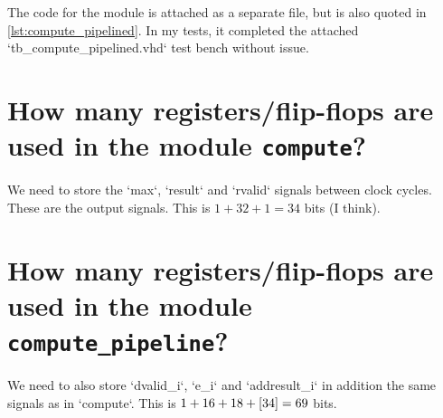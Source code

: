 \documentclass[british,fleqn]{article}
\begin{document}
The code for the module is attached as a separate file, but is also quoted in
\autoref{lst:compute_pipelined}. In my tests, it completed the attached
`tb_compute_pipelined.vhd` test bench without issue.



\section[Task 7]{%
  How many registers/flip-flops are used in the module \lstinline{compute}?%
}

We need to store the `max`, `result` and `rvalid` signals between clock cycles.
These are the output signals. This is $1 + 32 + 1 = 34$ bits (I think).

\section[Task 8]{%
  How many registers/flip-flops are used in the module
  \lstinline{compute_pipeline}?%
}

We need to also store `dvalid_i`, `e_i` and `addresult_i` in addition the
same signals as in `compute`. This is $1 + 16 + 18 + \sbr{34} = 69$ bits.
\end{document}
